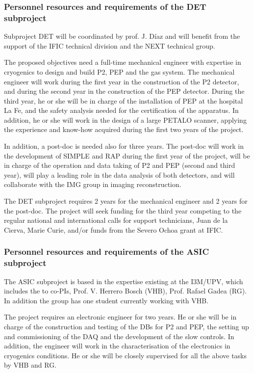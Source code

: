 \subsubsection*{Personnel resources and requirements of the DET subproject}

Subproject DET will be coordinated by prof. J. D\'iaz and will benefit from the support of the IFIC technical division and the NEXT technical group.

The proposed objectives need a full-time mechanical engineer with expertise in cryogenics to design and build P2, PEP and the gas system. The mechanical engineer will work during the first year in the construction of the P2 detector, and during the second year in the construction of the PEP detector. During the third year, he or she will be in charge of the installation of PEP at the hospital La Fe, and the safety analysis needed for the certification of the apparatus. In addition, he or she will work in the design of a large PETALO scanner, applying the experience and know-how acquired during the first two years of the project.

In addition, a post-doc is needed also for three years. The post-doc will work in the development of SIMPLE and RAP during the first year of the project, will be in charge of the operation and data taking of P2 and PEP (second and third year), will play a leading role in the data analysis of both detectors, and will collaborate with the IMG group in imaging reconstruction.

The DET subproject requires 2 years for the mechanical engineer and 2 years for the post-doc. The project will seek funding for the third year competing to the regular national and international calls for support technicians, Juan de la Cierva, Marie Curie, and/or funds from the Severo Ochoa grant at IFIC.

\subsubsection*{Personnel resources and requirements of the ASIC subproject}

The ASIC subproject is based in the expertise existing  at the I3M/UPV, which includes the to co-PIs, Prof. V. Herrero Bosch (VHB), Prof. Rafael Gadea (RG).
In addition the group has  one student  currently working with VHB.

The project requires an electronic engineer for two years. He or she will be in charge of the construction and testing of the DBs for P2 and PEP, the setting up and commissioning of the DAQ and the development of the slow controls. In addition, the engineer will work in the characterisation of the electronics in cryogenics conditions. He or she will be closely supervised for all the above tasks by VHB and RG.

